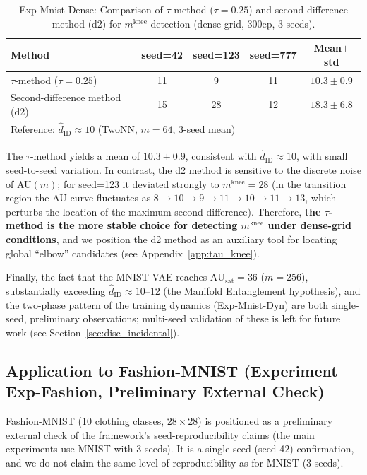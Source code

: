 \documentclass[make,article,submit,pdftex,moreauthors]{Definitions/mdpi}
\newcommand{\AUsat}{\mathrm{AU}_{\mathrm{sat}}}
\newcommand{\mknee}{m^{\mathrm{knee}}}
\begin{document}
\begin{table}[H]
\centering
\caption{Exp-Mnist-Dense: Comparison of $\tau$-method ($\tau=0.25$) and second-difference method (d2) for $\mknee$ detection (dense grid, 300ep, 3 seeds).}
\label{tab:el_knee_compare}
\small
\begin{tabular}{lcccc}
\toprule
Method & seed=42 & seed=123 & seed=777 & Mean$\pm$std \\
\midrule
$\tau$-method ($\tau=0.25$) & 11 & 9  & 11 & $10.3 \pm 0.9$ \\
Second-difference method (d2) & 15 & 28 & 12 & $18.3 \pm 6.8$ \\
\midrule
\multicolumn{5}{l}{Reference: $\hat{d}_\mathrm{ID} \approx 10$ (TwoNN, $m=64$, 3-seed mean)} \\
\bottomrule
\end{tabular}
\end{table}

The $\tau$-method yields a mean of $10.3 \pm 0.9$, consistent with
$\hat{d}_\mathrm{ID} \approx 10$, with small seed-to-seed variation.
In contrast, the d2 method is sensitive to the discrete noise of AU$(m)$; for seed=123 it
deviated strongly to $\mknee = 28$ (in the transition region the AU curve fluctuates as
$8 \to 10 \to 9 \to 11 \to 10 \to 11 \to 13$, which perturbs the location of the maximum
second difference).
Therefore, \textbf{the $\tau$-method is the more stable choice for detecting $\mknee$ under
dense-grid conditions}, and we position the d2 method as an auxiliary tool for locating
global ``elbow'' candidates (see Appendix~\ref{app:tau_knee}).

Finally, the fact that the MNIST VAE reaches $\AUsat = 36$ ($m=256$), substantially exceeding
$\hat{d}_\mathrm{ID} \approx 10$--12 (the Manifold Entanglement hypothesis), and the
two-phase pattern of the training dynamics (Exp-Mnist-Dyn) are both single-seed, preliminary
observations; multi-seed validation of these is left for future work
(see Section~\ref{sec:disc_incidental}).
\subsection{Application to Fashion-MNIST (Experiment Exp-Fashion, Preliminary External Check)}\label{sec:exp_fashion}

Fashion-MNIST (10 clothing classes, $28\times28$) is positioned as a preliminary external check
of the framework's seed-reproducibility claims (the main experiments use MNIST with 3 seeds).
It is a single-seed (seed 42) confirmation, and we do not claim the same level of reproducibility
as for MNIST (3 seeds).
\end{document}
